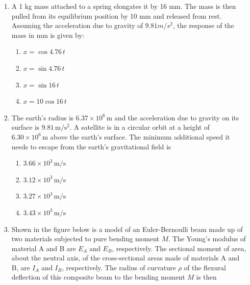 \documentclass{article}
\begin{document}
\begin{enumerate}
    \item A 1 kg mass attached to a spring elongates it by 16 mm. The mass is then pulled from its equilibrium position by 10 mm and released from rest. Assuming the acceleration due to gravity of $9.81 m/s^2$, the response of the mass in mm is given by: 
    \begin{enumerate}
        \item $x = \cos 4.76 \, t$
        \item $x = \sin 4.76 \, t$
        \item $x = \sin 16 \, t$
        \item $x = 10 \cos 16 \, t$ 
    \end{enumerate}
        

    \item The earth's radius is $6.37 \times 10^6 \, \mathrm{m}$ and the acceleration due to gravity on its surface is $9.81 \, \mathrm{m/s^2}$. A satellite is in a circular orbit at a height of $6.30 \times 10^6 \, \mathrm{m}$ above the earth's surface. The minimum additional speed it needs to escape from the earth's gravitational field is 
    \begin{multicols}{4}
    \begin{enumerate}
        \item $3.66 \times 10^3 \, \mathrm{m/s}$ 
        \item $3.12 \times 10^3 \, \mathrm{m/s}$ 
        \item $3.27 \times 10^3 \, \mathrm{m/s}$ 
        \item $3.43 \times 10^3 \, \mathrm{m/s}$ 
    \end{enumerate}
    \end{multicols}
        
\newpage
    \item Shown in the figure below is a model of an Euler-Bernoulli beam made up of two materials subjected to pure bending moment $M$. The Young's modulus of material A and B are $E_A$ and $E_B$, respectively. The sectional moment of area, about the neutral axis, of the cross-sectional areas made of materials A and B, are $I_A$ and $I_B$, respectively. The radius of curvature $\rho$ of the flexural deflection of this composite beam to the bending moment $M$ is then
        \begin{figure}[H]
            \centering
            
            \caption*{}
            \label{fig:q25}
        \end{figure}




\end{enumerate}
\end{document}
